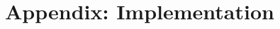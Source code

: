 \documentclass[11pt]{article}
\begin{document}
% 
% 
% 
% 

\section{Appendix: Implementation}
\end{document}
